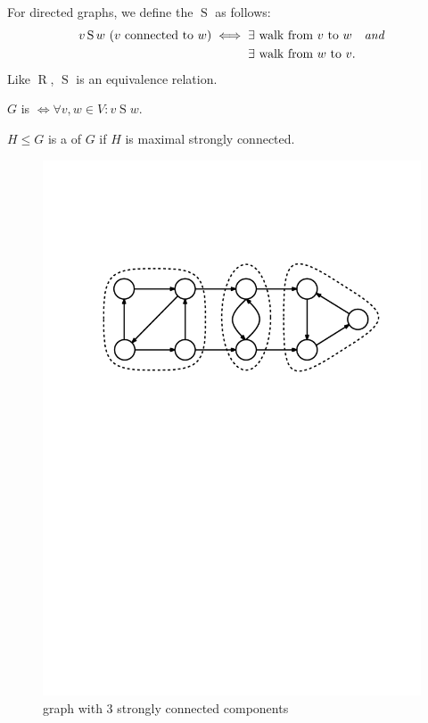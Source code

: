 \begin{definition}
For directed graphs, we define the  $\operatorname{S}$ as follows:
\begin{align*}
v \operatorname{S} w \text{ ($v$ connected to $w$)} \iff \null
&\text{$\exists$ walk from $v$ to $w$\quad\emph{and}} \\
&\text{$\exists$ walk from $w$ to $v$.}
\end{align*}
Like $\operatorname{R}$, $\operatorname{S}$ is an equivalence relation.
\end{definition}

\begin{definition}
$G$ is  $\iff \forall v,w\in V: v \operatorname{S} w$.
\end{definition}

\begin{definition}
$H\leq G$ is a  of $G$ if $H$ is maximal strongly connected.
\end{definition}

\begin{figure}[htb]
	\centering
	\includegraphics[scale=.5]{01_graph_theory/pics/strongly-connected_component.pdf}
	\caption{graph with 3 strongly connected components}
\end{figure}
\FloatBarrier


